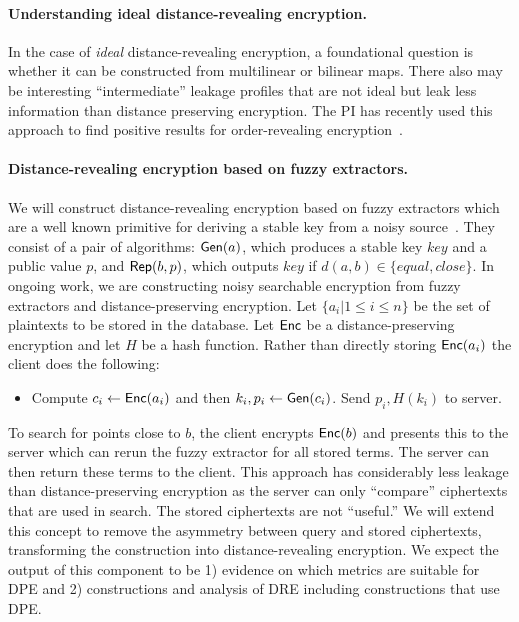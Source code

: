 \paragraph{Understanding ideal distance-revealing encryption.}
In the case of \emph{ideal} distance-revealing encryption, a foundational question is whether it can be constructed from multilinear or bilinear maps.  There also may be interesting ``intermediate'' leakage profiles that are not ideal but leak less information than distance preserving encryption.   The PI has recently used this approach to find positive results for order-revealing encryption~\cite{EPRINT:CLOZ16}.  %

\paragraph{Distance-revealing encryption based on fuzzy extractors.}
We will construct distance-revealing encryption based on fuzzy
extractors which are a well known primitive for deriving a stable key
from a noisy source~\cite{EC:DodReySmi04}.  They consist of a pair of
algorithms: $\mathsf{Gen}(a)$, which produces a stable key $key$ and a public
value $p$, and $\mathsf{Rep}(b, p)$, which outputs $key$ if $d(a,b)\in\{equal,close\}$.  In ongoing work, we are constructing noisy searchable encryption from fuzzy extractors and distance-preserving encryption.  Let $\{a_i | 1\le i \le n\}$ be the set of plaintexts to be stored in the database.  Let $\mathsf{Enc}$ be a distance-preserving encryption and let $H$ be a hash function.  Rather than directly storing $\mathsf{Enc}(a_i)$ the client does the following:

\begin{itemize}\setlength\itemsep{0em}
\item Compute $c_i \leftarrow \mathsf{Enc}(a_i)$ and then $k_i, p_i \leftarrow \mathsf{Gen}(c_i)$. Send $p_i, H(k_i)$ to server.
\end{itemize}

To search for points close to $b$, the client encrypts $\mathsf{Enc}(b)$ and presents this to the server which can rerun the fuzzy extractor for all stored terms.  The server can then return these terms to the client.  This approach has considerably less leakage than distance-preserving encryption as the server can only ``compare'' ciphertexts that are used in search.  The stored ciphertexts are not ``useful.''  We will extend this concept to remove the asymmetry between query and stored ciphertexts, transforming the construction into distance-revealing encryption.
We expect the output of this component to be 1) evidence on which metrics are suitable for DPE  and 2) constructions and analysis of DRE including constructions that use DPE.  

